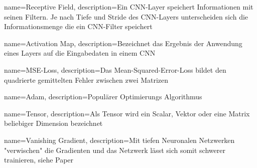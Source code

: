 {
	name={Receptive Field},
	description={Ein CNN-Layer speichert Informationen mit seinen Filtern. Je nach Tiefe und Stride des CNN-Layers unterscheiden sich die Informationsmenge die ein CNN-Filter speichert}
}

{
	name={Activation Map},
	description={Bezeichnet das Ergebnis der Anwendung eines Layers auf die Eingabedaten in einem CNN}
}

{
	name={MSE-Loss},
	description={Das Mean-Squared-Error-Loss bildet den quadrierte gemittelten Fehler zwischen zwei Matrizen}
}

{
	name={Adam},
	description={Populärer Optimierungs Algorithmus \cite{kingma2015adam}}
}


{
	name={Tensor},
	description={Als Tensor wird ein Scalar, Vektor oder eine Matrix beliebiger Dimension bezeichnet}
}

{
	name={Vanishing Gradient},
	description={Mit tiefen Neuronalen Netzwerken "verwischen" die Gradienten und das Netzwerk lässt sich somit schwerer trainieren, siehe Paper \cite{DBLP:journals/corr/HeZRS15}}
}